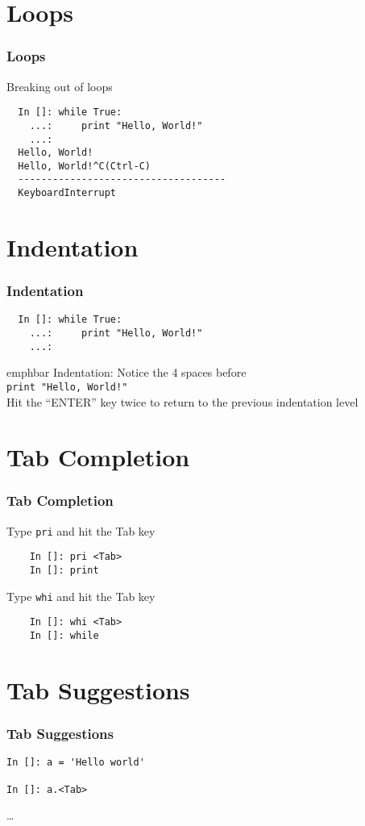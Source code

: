 \documentclass[14pt,compress]{beamer}
\newcommand{\emphbar}[1]
{\begin{beamercolorbox}[rounded=true]{emphbar} 
      {#1}
 \end{beamercolorbox}
}
\newcommand{\typ}[1]{\lstinline{#1}}
\begin{document}
\section{Loops}
\begin{frame}[fragile]
\frametitle{Loops}
Breaking out of loops
\begin{lstlisting}     
  In []: while True:
    ...:     print "Hello, World!"
    ...:     
  Hello, World!
  Hello, World!^C(Ctrl-C)
  ------------------------------------
  KeyboardInterrupt                   
\end{lstlisting}
\end{frame}

\section{Indentation}
\begin{frame}[fragile]
  \frametitle{Indentation}
  \begin{lstlisting}
  In []: while True:
    ...:     print "Hello, World!"
    ...:     
  \end{lstlisting}
\emphbar{\alert{Indentation: Notice the 4 spaces before\\} \typ{print "Hello, World!"}\\
  Hit the ``ENTER'' key twice to return to the previous indentation level}
\end{frame}

\section{Tab Completion}
\begin{frame}[fragile]
  \frametitle{Tab Completion}
  Type \typ{pri} and hit the Tab key
  \begin{lstlisting}
    In []: pri <Tab>
    In []: print
  \end{lstlisting}
  Type \typ{whi} and hit the Tab key
  \begin{lstlisting}
    In []: whi <Tab>
    In []: while
  \end{lstlisting}
\end{frame}

\section{Tab Suggestions}
\begin{frame}[fragile]
  \frametitle{Tab Suggestions}
  \begin{lstlisting}
In []: a = 'Hello world'

In []: a.<Tab>
  \end{lstlisting}
  \ldots
\end{frame}
\end{document}
